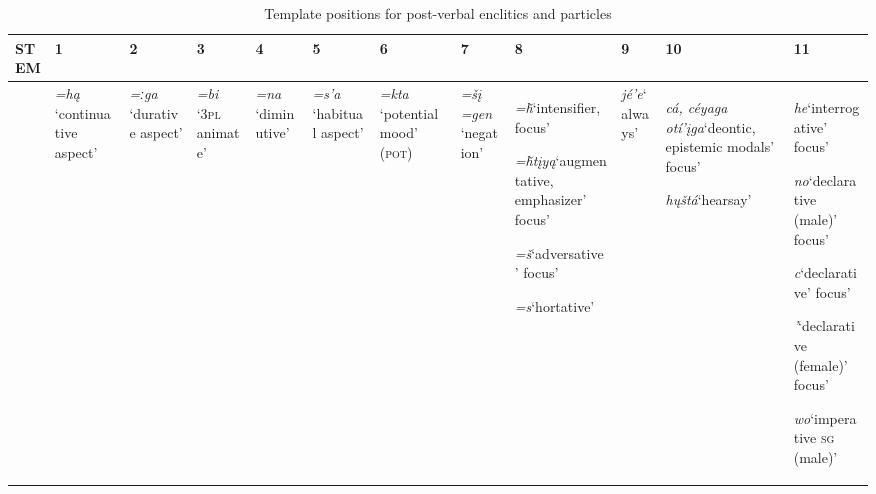 \documentclass[output=paper,colorlinks,citecolor=brown]{langscibook}
\begin{document}
\begin{table}
\footnotesize
\begin{tabularx}{\textwidth}{@{}l|Q|Q|Q|Q|Q|Q|Q|Q|Q|Q|Q}
        {STEM} & {1} & {2} & {3} & {4} & {5} & {6} & {7} &  {8} & {9} & {10} & {11} \\
        \hline
        & {\itshape =hą} \newline ‘conti\-nuative aspect’
        & {\itshape =ːga}  \newline ‘durative aspect’ 
        & {\itshape =bi} \newline ‘\textsc{3pl} animate’
        & {\itshape =na} \newline ‘dimin\-utive’
        & {\itshape =s’a} \newline ‘habitual aspect’ 
        & {\itshape =kta} \newline ‘potential mood’ (\textsc{pot)} 
        & {\itshape =šį \newline =gen} ‘negation’
        & \textit{=ȟ}\newline ‘inten\-sifier, focus’\medskip

            \textit{=ȟtįyą}\newline ‘augmen\-tative, emphasizer’ focus’\medskip

            \textit{=š}\newline ‘adver\-sative’ focus’\medskip

            \textit{=s}\newline ‘hortative’
        & \textit{jé’e}\newline ‘always’
        & \textit{cá, céyaga}
            \textit{otí’įga}\newline ‘deontic, epistemic modals’  focus’\medskip

            \textit{hųštá}\newline ‘hearsay’
        & \textit{he}\newline ‘inter\-rogative’ focus’\medskip

            \textit{no}\newline ‘declarative (male)’  focus’\medskip

            \textit{c}\newline ‘declarative’ focus’\medskip

            \textit{’}\newline ‘declarative (female)’ focus’\medskip

            \textit{wo}\newline ‘imperative \textsc{sg} (male)’\\
\end{tabularx}

\caption{Template positions for post-verbal enclitics and particles}
\label{tab:nak:1}
\end{table}
\end{document}
